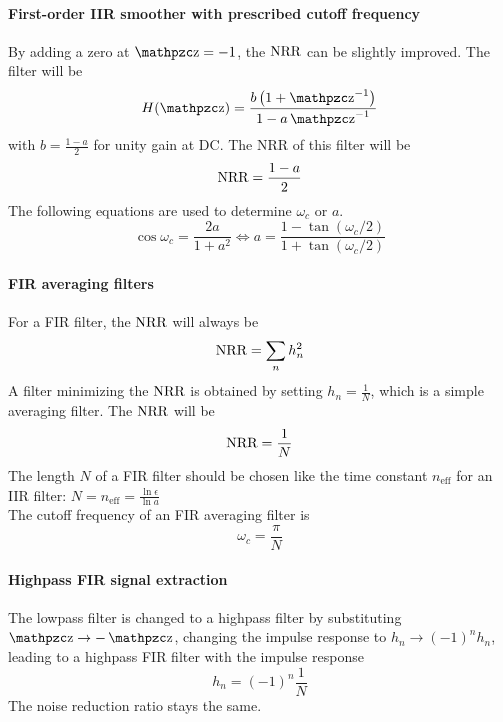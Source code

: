 \paragraph{First-order IIR smoother with prescribed cutoff frequency}
By adding a zero at $\z=-1$, the $\operatorname{\text{NRR}}$ can be slightly improved.
The filter will be
\begin{equation*}
	H(\z) = \frac{b \left( 1 + \z^{-1} \right)}{1 - a \z^{-1}}
\end{equation*}
with $b = \frac{1-a}{2}$ for unity gain at DC. The NRR of this filter will be
\begin{equation*}
	\operatorname{\text{NRR}} = \frac{1-a}{2}
\end{equation*}
The following equations are used to determine $\omega_c$ or $a$.
\begin{equation*}
	\cos \omega_c = \frac{2 a}{1+a^2} \Leftrightarrow a = \frac{1-\tan(\omega_c/2)}{1+\tan(\omega_c/2)}
\end{equation*}

\paragraph{FIR averaging filters}
For a FIR filter, the $\operatorname{\text{NRR}}$ will always be
\begin{equation*}
	\operatorname{\text{NRR}} = \sum\limits_n h_n^2
\end{equation*}
A filter minimizing the $\operatorname{\text{NRR}}$ is obtained by setting $h_n = \frac{1}{N}$, which is a simple averaging filter. The $\operatorname{\text{NRR}}$ will be
\begin{equation*}
	\operatorname{\text{NRR}} = \frac{1}{N}
\end{equation*}
The length $N$ of a FIR filter should be chosen like the time constant
$n_{\text{eff}}$ for an IIR filter:
$N = n_{\text{eff}} = \frac{\ln \epsilon}{\ln a}$ \\

The cutoff frequency of an FIR averaging filter is
\begin{equation*}
	\omega_c = \frac{\pi}{N}
\end{equation*}

\paragraph{Highpass FIR signal extraction}
The lowpass filter is changed to a highpass filter by substituting $\z \to -\z$,
changing the impulse response to $h_n \to (-1)^n h_n$, leading to
a highpass FIR filter with the impulse response
\begin{equation*}
	h_n = (-1)^n \frac{1}{N}
\end{equation*}
The noise reduction ratio stays the same.

